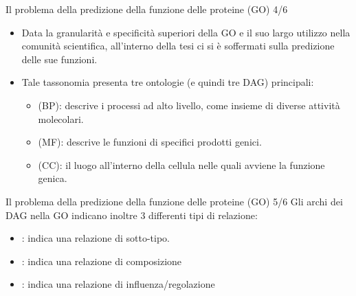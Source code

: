\documentclass{beamer}
\begin{document}
\begin{tframe}{\small Il problema della predizione della funzione delle proteine (GO) 4/6}
\begin{itemize}
\item Data la granularità e specificità superiori della GO e il suo largo utilizzo nella comunità scientifica, all’interno della tesi ci si è soffermati sulla predizione delle sue funzioni.
\item Tale tassonomia presenta tre ontologie (e quindi tre DAG) principali:
\begin{itemize}
\item {} (BP): descrive i processi ad alto livello, come insieme di diverse attività molecolari.
\item {} (MF): descrive le funzioni di specifici prodotti genici.
\item {} (CC): il luogo all’interno della cellula nelle quali avviene la funzione genica.
\end{itemize}
\end{itemize}  

\end{tframe}

\begin{tframe}{\small Il problema della predizione della funzione delle proteine (GO) 5/6}
Gli archi dei DAG nella GO indicano inoltre 3 differenti tipi di relazione:
\begin{itemize}
\item {}: indica una relazione di sotto-tipo.
\item {}: indica una relazione di composizione
\item {}: indica una relazione di influenza/regolazione
\end{itemize} 

\end{tframe}
\end{document}
